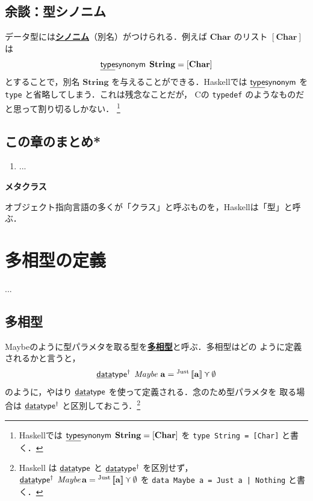\documentclass[a5paper,twoside,fleqn,draft]{jsbook}
\def\[{\left[\!\left[}
\def\]{\right]\!\right]}
\newcommand{\programminglanguage}[1]{\textsf{#1}}
\newcommand{\clang}{\programminglanguage{C}}
\newcommand{\haskell}{\programminglanguage{Haskell}}
\newenvironment{note}[1]{\begin{boxnote}\begin{center}\textbf{#1}\end{center}}{\end{boxnote}}
\newcommand{\keyword}[1]{{\underline{\textbf{#1}}}}
\newcommand{\code}[1]{\texttt{#1}}
\newcommand{\mKeyword}[1]{\mathsf{#1}} %
\newcommand{\mKeywordUnderline}[1]{\text{\underline{\textsf{#1}}}} %
\newcommand{\mDataTypeKeyword}{\mKeywordUnderline{data}\mKeyword{type}}
\newcommand{\mTypeSynonymKeyword}{\mKeywordUnderline{type}\mKeyword{synonym}}
\DeclareMathOperator{\mDataType}{\mDataTypeKeyword}
\DeclareMathOperator{\mDataTypeParametric}{\mDataTypeKeyword^\dagger}
\DeclareMathOperator{\mTypeSynonym}{\mTypeSynonymKeyword}
\newcommand{\mNothing}{\emptyset}
\DeclareMathOperator{\mValueOr}{\curlyvee}
\newcommand{\mType}[1]{\mathbf{#1}}
\newcommand{\mCharType}{\mType{Char}}
\newcommand{\mStringType}{\mType{String}}
\newcommand{\mListType}[1]{[\mType{#1}]}
\newcommand{\mGenericTypeAssemble}[2]{{}^{\mType{#1}}\[\mType{#2}\]}
\newcommand{\mMaybeType}[1]{\mGenericTypeAssemble{Maybe}{#1}}
\newcommand{\mTypeConstructor}[1]{\textit{#1}}
\DeclareMathOperator{\mMaybeTypeConstructor}{\mTypeConstructor{Maybe}}
\newcommand{\mValueConstructor}[1]{\mathrm{#1}}
\newcommand{\mGenericValueAssemble}[2]{{}^\mValueConstructor{#1}\[#2\]}
\newcommand{\mJustWith}[1]{\mGenericValueAssemble{Just}{#1}}
\begin{document}
\section{余談：型シノニム}

データ型には\keyword{シノニム}（別名）がつけられる．例えば
$\mCharType$ のリスト $\mListType{\mCharType}$ は
\begin{equation}
\mTypeSynonym\;\mStringType=\mListType{\mCharType}
\end{equation}
とすることで，別名 $\mStringType$ を与えることができる．\haskell では
$\mTypeSynonym$ を \code{type} と省略してしまう．これは残念なことだが，
\clang の \code{typedef} のようなものだと思って割り切るしかない．
\footnote{\haskell では
$\mTypeSynonym\;\mStringType=\mListType{\mCharType}$ を \code{type
String = [Char]} と書く．}

\section{この章のまとめ*}

\begin{enumerate}
\item ...
\end{enumerate}

\begin{note}{メタクラス}
オブジェクト指向言語の多くが「クラス」と呼ぶものを，\haskell は「型」と呼ぶ．


\end{note}


\chapter{多相型の定義}
\label{ch:parametric-data-type}
...

\section{多相型}

Maybeのように型パラメタを取る型を\keyword{多相型}と呼ぶ．多相型はどの
ように定義されるかと言うと，
\begin{equation}
\mDataTypeParametric\;\mMaybeTypeConstructor\,\mType{a}
=\mJustWith{\mType{a}}\mValueOr\mNothing
\end{equation}
のように，やはり $\mDataType$ を使って定義される．念のため型パラメタを
取る場合は $\mDataTypeParametric$ と区別しておこう．\footnote{\haskell
は $\mDataType$ と $\mDataTypeParametric$ を区別せず，
$\mDataTypeParametric\;\mMaybeTypeConstructor\mType{a}
=\mJustWith{\mType{a}}\mValueOr\mNothing$ を \code{data Maybe a =
Just a | Nothing} と書く．}
\end{document}
